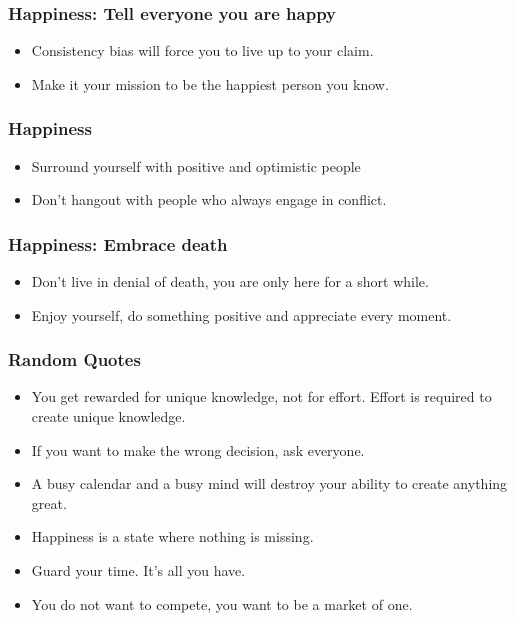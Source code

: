 \begin{frame}[fragile]\frametitle{ Happiness: Tell everyone you are happy}

\begin{itemize}
\item Consistency bias will force you to live up to your claim.
\item Make it your mission to be the happiest person you know.
\end{itemize}

\end{frame}

\begin{frame}[fragile]\frametitle{ Happiness}

\begin{itemize}
\item Surround yourself with positive and optimistic people
\item Don’t hangout with people who always engage in conflict.
\end{itemize}

\end{frame}

\begin{frame}[fragile]\frametitle{ Happiness: Embrace death}

\begin{itemize}
\item Don’t live in denial of death, you are only here for a short while.
\item Enjoy yourself, do something positive and appreciate every moment.
\end{itemize}

\end{frame}

\begin{frame}[fragile]\frametitle{ Random Quotes}

\begin{itemize}
\item You get rewarded for unique knowledge, not for effort. Effort is required to create unique knowledge.
\item If you want to make the wrong decision, ask everyone.
\item A busy calendar and a busy mind will destroy your ability to create
anything great.
\item Happiness is a state where nothing is missing.
\item Guard your time. It’s all you have.
\item You do not want to compete, you want to be a market of one. 
\end{itemize}

\end{frame}

